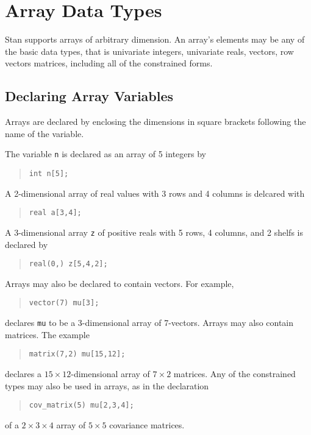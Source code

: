 \documentclass[10pt]{report}
\newcommand{\Stan}{Stan\xspace}
\newcommand{\code}[1]{{\tt #1}}
\begin{document}
\section{Array Data Types}

\Stan supports arrays of arbitrary dimension.  An array's elements may
be any of the basic data types, that is univariate integers,
univariate reals, vectors, row vectors matrices, including all of the
constrained forms.

\subsection{Declaring Array Variables}

Arrays are declared by enclosing the dimensions in square brackets
following the name of the variable.

The variable \code{n} is declared as an array of 5 integers by
%
\begin{quote}
\begin{Verbatim}  
int n[5];
\end{Verbatim}
\end{quote}
% 
A 2-dimensional array of real values with 3 rows and 4 columns is
delcared with
%
\begin{quote}
\begin{Verbatim}  
real a[3,4];
\end{Verbatim}
\end{quote}
% 
A 3-dimensional array \code{z} of positive reals with 5 rows, 4
columns, and 2 shelfs is declared by
%
\begin{quote}
\begin{Verbatim} 
real(0,) z[5,4,2];
\end{Verbatim}
\end{quote}
%

Arrays may also be declared to contain vectors.  For example,
%
\begin{quote}
\begin{Verbatim}  
vector(7) mu[3];
\end{Verbatim}
\end{quote}
% 
declares \code{mu} to be a 3-dimensional array of 7-vectors.  
Arrays may also contain matrices.  The example
%
\begin{quote}
\begin{Verbatim} 
matrix(7,2) mu[15,12];
\end{Verbatim}
\end{quote}
%
declares a $15 \times 12$-dimensional array of $7 \times 2$ matrices.
Any of the constrained types may also be used in arrays, as in the
declaration
%
\begin{quote}
\begin{Verbatim}  
cov_matrix(5) mu[2,3,4];
\end{Verbatim}
\end{quote}
% 
of a $2 \times 3 \times 4$ array of $5 \times 5$ covariance matrices.
\end{document}
